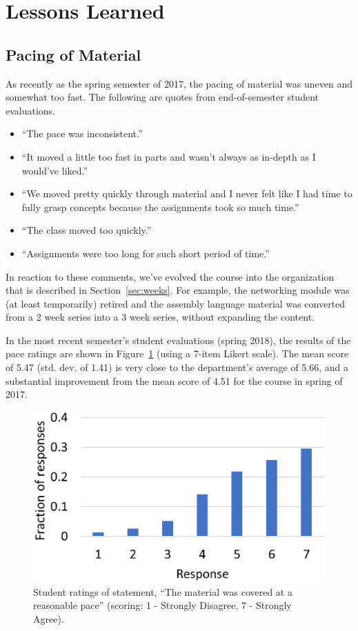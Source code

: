 \section{Lessons Learned}
\label{sec:lessons}


\subsection{Pacing of Material}


As recently as the spring semester of 2017, the pacing of material
was uneven and somewhat too fast.  The following are quotes from
end-of-semester student evaluations.
\begin{itemize}
\item ``The pace was inconsistent.''
\item ``It moved a little too fast in parts and wasn't always as
in-depth as I would've liked.''
\item ``We moved pretty quickly through material and I never felt like I had
time to fully grasp concepts because the assignments took so much time.''
\item ``The class moved too quickly.''
\item ``Assignments were too long for such short period of time.''
\end{itemize}
In reaction to these comments, we've evolved the course into the organization
that is described in Section~\ref{sec:weeks}.
For example, the networking module was (at least temporarily) retired
and the assembly language material was converted from a
2 week series into a 3 week series, without expanding the content.

In the most recent semester's student evaluations (spring 2018),
the results of the pace ratings are shown in Figure~\ref{fig:pace}
(using a 7-item Likert scale).
The mean score of 5.47 (std. dev. of 1.41)
is very close to the department's average of
5.66, and a substantial improvement from the mean score of 4.51
for the course in spring of 2017.

\begin{figure}[ht]
\centering
\includegraphics[width=0.5\columnwidth]{pace}
\caption{Student ratings of statement, ``The material was covered
at a reasonable pace''  (scoring: 1 - Strongly Disagree, 7 - Strongly Agree).}
\label{fig:pace}
\end{figure}

